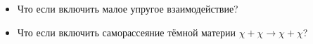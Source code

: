 \begin{itemize}
	\item Что если включить малое упругое взаимодействие?
	\item Что если включить саморассеяние тёмной материи $\chi + \chi \rightarrow \chi + \chi$?
	
\end{itemize}